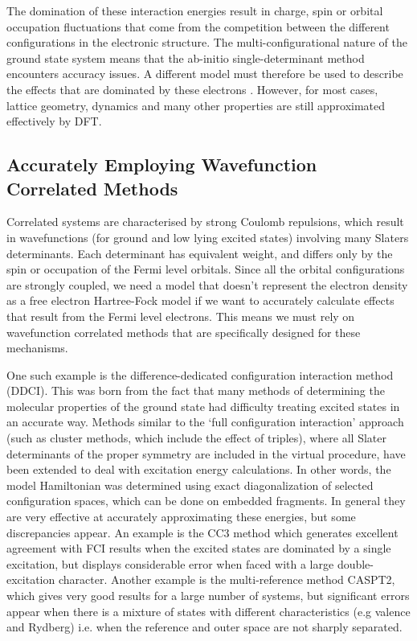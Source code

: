 \documentclass[10pt]{article}
\begin{document}
The domination of these interaction energies result in charge, spin or orbital occupation fluctuations that come from the competition between the different configurations in the electronic structure. The multi-configurational nature of the ground state system means that the ab-initio single-determinant method encounters accuracy issues. A different model must therefore be used to describe the effects that are dominated by these electrons \cite{gelle2009accurate}. However, for most cases, lattice geometry, dynamics and many other properties are still approximated effectively by DFT.

\subsection{Accurately Employing Wavefunction Correlated Methods}

Correlated systems are characterised by strong Coulomb repulsions, which result in wavefunctions (for ground and low lying excited states) involving many Slaters determinants. Each determinant has equivalent weight, and differs only by the spin or occupation of the Fermi level orbitals. Since all the orbital configurations are strongly coupled, we need a model that doesn't represent the electron density as a free electron Hartree-Fock model if we want to accurately calculate effects that result from the Fermi level electrons. This means we must rely on wavefunction correlated methods that are specifically designed for these mechanisms. 

One such example is the difference-dedicated configuration interaction method (DDCI). This was born from the fact that many methods of determining the molecular properties of the ground state had difficulty treating excited states in an accurate way. Methods similar to the `full configuration interaction' approach (such as cluster methods, which include the effect of triples), where all Slater determinants of the proper symmetry are included in the virtual procedure, have been extended to deal with excitation energy calculations. In other words, the model Hamiltonian was determined using exact diagonalization of selected configuration spaces, which can be done on embedded fragments. In general they are very effective at accurately approximating these energies, but some discrepancies appear. An example is the CC3 method which generates excellent agreement with FCI results when the excited states are dominated by a single excitation, but displays considerable error when faced with a large double-excitation character. Another example is the multi-reference method CASPT2, which gives very good results for a large number of systems, but significant errors appear when there is a mixture of states with different characteristics (e.g valence and Rydberg) i.e. when the reference and outer space are not sharply separated.
\end{document}

